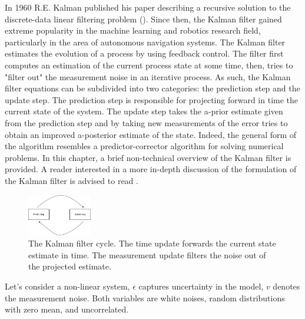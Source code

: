 \documentclass[mscthesis]{usiinfthesis}
\begin{document}
In 1960 R.E. Kalman published his paper describing a recursive solution to the discrete-data linear filtering problem (\citet{paper:kalmanfilter}). Since then, the Kalman filter gained extreme popularity in the machine learning and robotics research field, particularly in the area of autonomous navigation systems. The Kalman filter estimates the evolution of a process by using feedback control. The filter first computes an estimation of the current process state at some time, then, tries to "filter out" the measurement noise in an iterative process. As such, the Kalman filter equations can be subdivided into two categories: the prediction step and the update step. The prediction step is responsible for projecting forward in time the current state of the system. The update step takes the a-prior estimate given from the prediction step and by taking new measurements of the error tries to obtain an improved a-posterior estimate of the state. Indeed, the general form of the algorithm resembles a predictor-corrector algorithm for solving numerical problems. In this chapter, a brief non-technical overview of the Kalman filter is provided. A reader interested in a more in-depth discussion of the formulation of the Kalman filter is advised to read \citet{paper:Maybeck79}.


\begin{figure}[h]
    \centering
    \includegraphics[width=0.25\textwidth]{kalman_diagram.png}
    \caption{The Kalman filter cycle. The time update forwards the current state estimate in time. The measurement update filters the noise out of the projected estimate.}
    \label{fig:kalman_cycle}
\end{figure}



Let's consider a non-linear system, $\epsilon$ captures uncertainty in the model, $v$ denotes the measurement noise. Both variables are white noises, random distributions with zero mean, and uncorrelated. 
\end{document}
